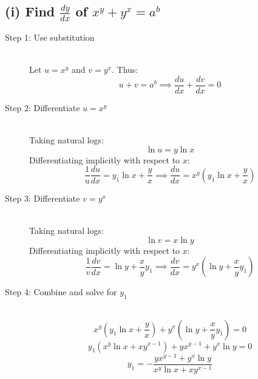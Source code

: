 \documentclass[11pt, a4paper]{article}
\begin{document}
\subsection*{(i) Find $\frac{dy}{dx}$ of $x^y + y^x = a^b$}
\begin{description}
    \item[Step 1: Use substitution] \ \\
    Let $u = x^y$ and $v = y^x$. Thus:
    \[ u + v = a^b \implies \frac{du}{dx} + \frac{dv}{dx} = 0 \]

    \item[Step 2: Differentiate $u = x^y$] \ \\
    Taking natural logs:
    \[ \ln u = y \ln x \]
    Differentiating implicitly with respect to $x$:
    \[ \frac{1}{u}\frac{du}{dx} = y_1 \ln x + \frac{y}{x} \implies \frac{du}{dx} = x^y \left( y_1 \ln x + \frac{y}{x} \right) \]

    \item[Step 3: Differentiate $v = y^x$] \ \\
    Taking natural logs:
    \[ \ln v = x \ln y \]
    Differentiating implicitly with respect to $x$:
    \[ \frac{1}{v}\frac{dv}{dx} = \ln y + \frac{x}{y} y_1 \implies \frac{dv}{dx} = y^x \left( \ln y + \frac{x}{y} y_1 \right) \]

    \item[Step 4: Combine and solve for $y_1$] \ \\
    \[ x^y \left( y_1 \ln x + \frac{y}{x} \right) + y^x \left( \ln y + \frac{x}{y} y_1 \right) = 0 \]
    \[ y_1 \left( x^y \ln x + x y^{x-1} \right) + y x^{y-1} + y^x \ln y = 0 \]
    \[ y_1 = -\frac{y x^{y-1} + y^x \ln y}{x^y \ln x + x y^{x-1}} \]
\end{description}
\end{document}
